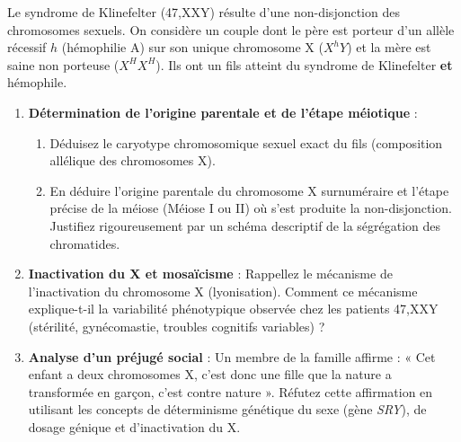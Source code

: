 \documentclass[11pt]{article}
\begin{document}
\begin{exercice}
Le syndrome de Klinefelter (47,XXY) résulte d'une non-disjonction des chromosomes sexuels. On considère un couple dont le père est porteur d'un allèle récessif $h$ (hémophilie A) sur son unique chromosome X ($X^hY$) et la mère est saine non porteuse ($X^HX^H$). Ils ont un fils atteint du syndrome de Klinefelter \textbf{et} hémophile.

\begin{enumerate}
    \item \textbf{Détermination de l'origine parentale et de l'étape méiotique} : 
    \begin{enumerate}
        \item Déduisez le caryotype chromosomique sexuel exact du fils (composition allélique des chromosomes X).
        \item En déduire l'origine parentale du chromosome X surnuméraire et l'étape précise de la méiose (Méiose I ou II) où s'est produite la non-disjonction. Justifiez rigoureusement par un schéma descriptif de la ségrégation des chromatides.
    \end{enumerate}
    \item \textbf{Inactivation du X et mosaïcisme} : Rappellez le mécanisme de l'inactivation du chromosome X (lyonisation). Comment ce mécanisme explique-t-il la variabilité phénotypique observée chez les patients 47,XXY (stérilité, gynécomastie, troubles cognitifs variables) ?
    \item \textbf{Analyse d'un préjugé social} : Un membre de la famille affirme : « Cet enfant a deux chromosomes X, c'est donc une fille que la nature a transformée en garçon, c'est contre nature ». Réfutez cette affirmation en utilisant les concepts de déterminisme génétique du sexe (gène \textit{SRY}), de dosage génique et d'inactivation du X.
\end{enumerate}
\end{exercice}
\end{document}
